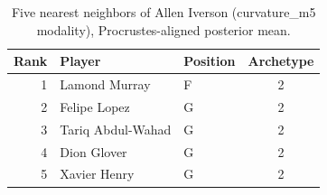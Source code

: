 \begin{table}[htbp]
  \centering\small
  \begin{tabular}{rllc}
    \toprule
    Rank & Player & Position & Archetype \\
    \midrule
    1 & Lamond Murray & F & 2 \\
    2 & Felipe Lopez & G & 2 \\
    3 & Tariq Abdul-Wahad & G & 2 \\
    4 & Dion Glover & G & 2 \\
    5 & Xavier Henry & G & 2 \\
    \bottomrule
  \end{tabular}
  \caption{Five nearest neighbors of Allen Iverson (curvature_m5 modality), Procrustes-aligned posterior mean.}
  \label{tab:Allen_Iverson_neighbors_curvature_m5}
\end{table}

